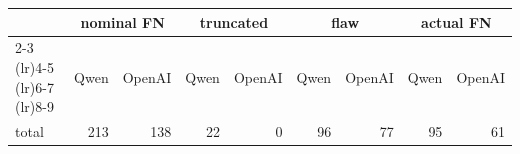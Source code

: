 \begin{tabular}{l*{8}{r}}
\toprule
 & \multicolumn{2}{c}{nominal FN} & \multicolumn{2}{c}{truncated} & \multicolumn{2}{c}{flaw} & \multicolumn{2}{c}{actual FN} \\
\cmidrule(lr){2-3} \cmidrule(lr){4-5} \cmidrule(lr){6-7} \cmidrule(lr){8-9}
 & Qwen & OpenAI & Qwen & OpenAI & Qwen & OpenAI & Qwen & OpenAI \\
\midrule
total & 213 & 138 & 22 & 0 & 96 & 77 & 95 & 61 \\
\bottomrule
\end{tabular}
